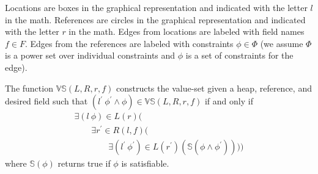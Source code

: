 Locations are boxes in the graphical representation and indicated with
the letter $l$ in the math. References are circles in the graphical
representation and indicated with the letter $r$ in the math. Edges
from locations are labeled with field names $f \in F$. Edges from the
references are labeled with constraints $\phi \in \Phi$ (we assume
$\Phi$ is a power set over individual constraints and $\phi$ is a set
of constraints for the edge).

The function $\mathbb{VS}(L,R,r,f)$ constructs the value-set given a
heap, reference, and desired field such that
$(l^\prime\ \phi^\prime\wedge\phi) \in \mathbb{VS}(L,R,r,f)$ if and
only if
\[
\begin{array}{l}
  \exists (l\ \phi) \in L(r) ( \\
  \ \ \ \ \ \ \ \ \ \exists r^\prime \in R(l,f) ( \\
  \ \ \ \ \ \ \ \ \ \ \ \ \ \ \ \ \ \ \exists (l^\prime\ \phi^\prime) \in L(r^\prime) (\mathbb{S}(\phi\wedge\phi^\prime))))
\end{array}
\]
where $\mathbb{S}(\phi)$ returns true if $\phi$ is satisfiable.



\begin{comment}
\begin{algorithm}
 \SetAlgoLined
 \KwData{this text}
 \KwResult{how to write algorithm with \LaTeX2e }
 initialization\;
 \While{not at end of this document $\wedge x < 2$}{
  read current\;
  \eIf{understand}{
   go to next section\;
   current section becomes this one\;
   }{
   go back to the beginning of current section\;
  }
 }
 \caption{How to write algorithms}
\end{algorithm}
\end{comment}
